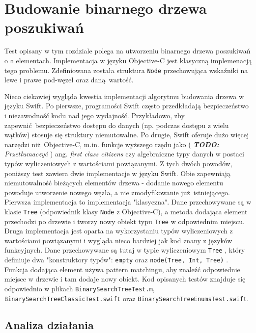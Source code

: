 \documentclass[mgr, shortabstract]{iithesis}
\newcommand{\todo}[1]{
  \textit{\textbf{TODO: }#1}
}
\newcommand{\ang}[1]{ang. \textit{#1}}
\newcommand{\swiftinline}[1]{
    \texttt{#1}
}
\newcommand{\objcinline}[1]{
    \texttt{#1}
}
\begin{document}
\section{Budowanie binarnego drzewa poszukiwań}

Test opisany w tym rozdziale polega na utworzeniu binarnego drzewa poszukiwań o \swiftinline{n} elementach. Implementacja w języku Objective-C jest klasyczną implemenacją tego problemu. Zdefiniowana została struktura \objcinline{Node} przechowująca wskaźniki na lewe i prawe pod-węzeł oraz daną wartość.

Nieco ciekawiej wygląda kwestia implementacji algorytmu budowania drzewa w języku Swift. Po pierwsze, programości Swift często przedkładają bezpieczeństwo i niezawodność kodu nad jego wydajność. Przykładowo, zby zapewnić bezpieczeństwo dostępu do danych (np. podczas dostępu z wielu wątków) stosuje się struktury niemutowalne. Po drugie, Swift oferuje dużo więcej narzędzi niż Objective-C, m.in. funkcje wyższego rzędu jako (\todo{Przetłumaczyć}) \ang{first class citizens} czy algebraiczne typy danych w postaci typów wyliczeniowych z wartościami powiązanymi. Z tych dwóch powodów, poniższy test zawiera dwie implementacje w języku Swift. Obie zapewniają niemutowalność bieżących elementów drzewa - dodanie nowego elementu powoduje utworzenie nowego węzła, a nie zmodyfikowanie już istniejącego. Pierwsza implementacja to implementacja "klasyczna". Dane przechowywane są w klasie \swiftinline{Tree} (odpowiednik klasy \objcinline{Node} z Objective-C), a metoda dodająca element przechodzi po drzewie i tworzy nowy obiekt typu \swiftinline{Tree} w odpowiednim miejscu. Druga implementacja jest oparta na wykorzystaniu typów wyliczeniowych z wartościami powiązanymi i wygląda nieco bardziej jak kod znany z języków funkcyjnych. Dane przechowywane są tutaj w typie wyliczeniowym \swiftinline{Tree}, który definiuje dwa "konstruktory typów": \swiftinline{empty} oraz \swiftinline{node(Tree, Int, Tree)}. Funkcja dodająca element używa pattern matchingu, aby znaleźć odpowiednie miejsce w drzewie i tam dodaje nowy obiekt. Kod opisanych testów znajduje się odpowiednio w plikach \texttt{BinarySearchTreeTest.m}, \texttt{BinarySearchTreeClassicTest.swift} oraz \texttt{BinarySearchTreeEnumsTest.swift}.

\subsection{Analiza działania}
\end{document}
